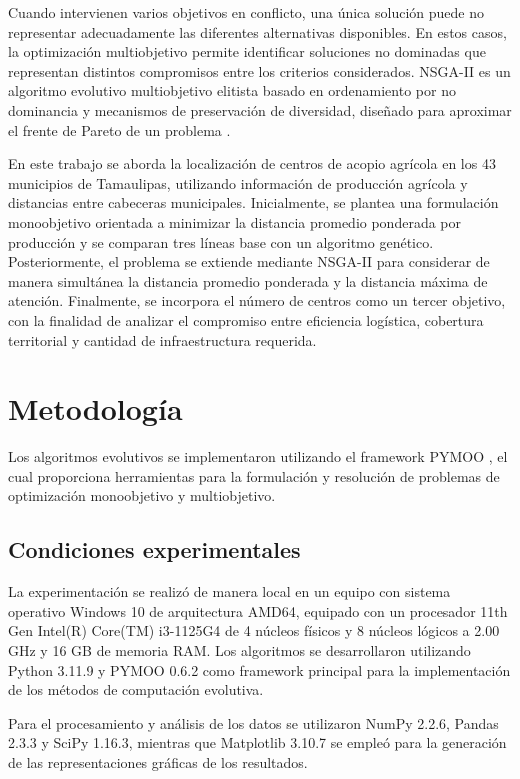 \documentclass[journal]{IEEEtran}
\begin{document}
Cuando intervienen varios objetivos en conflicto, una única solución puede no representar adecuadamente las diferentes alternativas disponibles. En estos casos, la optimización multiobjetivo permite identificar soluciones no dominadas que representan distintos compromisos entre los criterios considerados. NSGA-II es un algoritmo evolutivo multiobjetivo elitista basado en ordenamiento por no dominancia y mecanismos de preservación de diversidad, diseñado para aproximar el frente de Pareto de un problema \cite{deb2002nsga2}.

En este trabajo se aborda la localización de centros de acopio agrícola en los 43 municipios de Tamaulipas, utilizando información de producción agrícola y distancias entre cabeceras municipales. Inicialmente, se plantea una formulación monoobjetivo orientada a minimizar la distancia promedio ponderada por producción y se comparan tres líneas base con un algoritmo genético. Posteriormente, el problema se extiende mediante NSGA-II para considerar de manera simultánea la distancia promedio ponderada y la distancia máxima de atención. Finalmente, se incorpora el número de centros como un tercer objetivo, con la finalidad de analizar el compromiso entre eficiencia logística, cobertura territorial y cantidad de infraestructura requerida.

\section{Metodología}
Los algoritmos evolutivos se implementaron utilizando el framework PYMOO \cite{blank2020pymoo}, el cual proporciona herramientas para la formulación y resolución de problemas de optimización monoobjetivo y multiobjetivo.

\subsection{Condiciones experimentales}

La experimentación se realizó de manera local en un equipo con sistema operativo Windows 10 de arquitectura AMD64, equipado con un procesador 11th Gen Intel(R) Core(TM) i3-1125G4 de 4 núcleos físicos y 8 núcleos lógicos a 2.00 GHz y 16 GB de memoria RAM. Los algoritmos se desarrollaron utilizando Python 3.11.9 y PYMOO 0.6.2 como framework principal para la implementación de los métodos de computación evolutiva.

Para el procesamiento y análisis de los datos se utilizaron NumPy 2.2.6, Pandas 2.3.3 y SciPy 1.16.3, mientras que Matplotlib 3.10.7 se empleó para la generación de las representaciones gráficas de los resultados.
\end{document}
